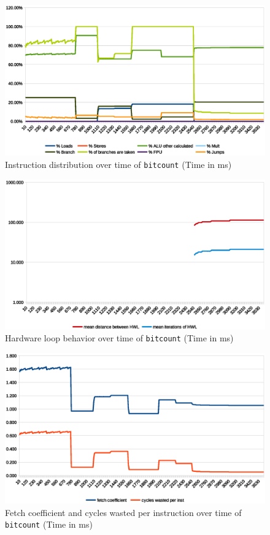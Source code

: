 \documentclass[../bachelor_paper.tex]{subfiles}
\begin{document}
\begin{figure}
    \centering
    \includegraphics[width=\textwidth]{img/graph/mibench/bitcount_inst.eps}
    \caption{Instruction distribution over time of \texttt{bitcount} (Time in ms)}
    \label{fig:res/bitcount/inst}
\end{figure}

\begin{figure}
    \centering
    \includegraphics[width=\textwidth]{img/graph/mibench/bitcount_hwl.eps}
    \caption{Hardware loop behavior over time of \texttt{bitcount} (Time in ms)}
    \label{fig:res/bitcount/hwl}
\end{figure}

\begin{figure}
    \centering
    \includegraphics[width=\textwidth]{img/graph/mibench/bitcount_fetch_waste.eps}
    \caption{Fetch coefficient and cycles wasted per instruction over time of \texttt{bitcount} (Time in ms)}
    \label{fig:res/bitcount/fetch_waste}
\end{figure}
\end{document}
